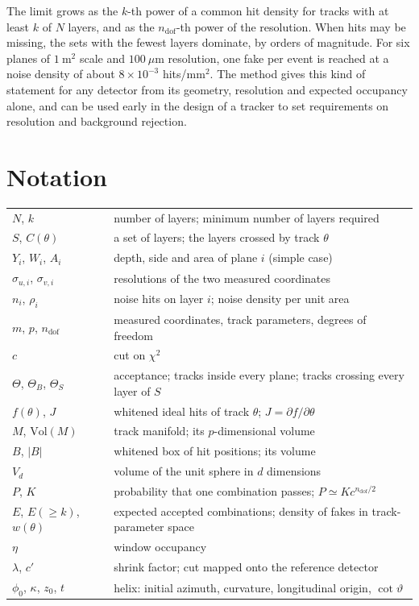 \IfFileExists{jinst.cls}{\documentclass[a4paper,11pt]{jinst}}
\newcommand{\ndof}{n_\mathrm{dof}}
\newcommand{\Vol}{\mathrm{Vol}}
\begin{document}
The limit grows as the $k$-th power of a common hit density for tracks with at least $k$ of $N$
layers, and as the $\ndof$-th power of the resolution. When hits may be missing, the sets with the
fewest layers dominate, by orders of magnitude. For six planes of $1~\mathrm{m}^2$ scale and
$100~\mu$m resolution, one fake per event is reached at a noise density of about
$8\times10^{-3}$ hits/mm$^2$. The method gives this kind of statement for any detector from its
geometry, resolution and expected occupancy alone, and can be used early in the design of a
tracker to set requirements on resolution and background rejection.

\appendix
\section{Notation}\label{app:notation}

\begin{tabular}{ll}
  $N$, $k$ & number of layers; minimum number of layers required \\
  $S$, $C(\theta)$ & a set of layers; the layers crossed by track $\theta$ \\
  $Y_i$, $W_i$, $A_i$ & depth, side and area of plane $i$ (simple case) \\
  $\sigma_{u,i}$, $\sigma_{v,i}$ & resolutions of the two measured coordinates \\
  $n_i$, $\rho_i$ & noise hits on layer $i$; noise density per unit area \\
  $m$, $p$, $\ndof$ & measured coordinates, track parameters, degrees of freedom \\
  $c$ & cut on $\chi^2$ \\
  $\Theta$, $\Theta_B$, $\Theta_S$ & acceptance; tracks inside every plane; tracks crossing every layer of $S$ \\
  $f(\theta)$, $J$ & whitened ideal hits of track $\theta$; $J=\partial f/\partial\theta$ \\
  $M$, $\Vol(M)$ & track manifold; its $p$-dimensional volume \\
  $B$, $|B|$ & whitened box of hit positions; its volume \\
  $V_d$ & volume of the unit sphere in $d$ dimensions \\
  $P$, $K$ & probability that one combination passes; $P\simeq Kc^{\ndof/2}$ \\
  $E$, $E(\ge k)$, $w(\theta)$ & expected accepted combinations; density of fakes in track-parameter space \\
  $\eta$ & window occupancy \\
  $\lambda$, $c'$ & shrink factor; cut mapped onto the reference detector \\
  $\phi_0$, $\kappa$, $z_0$, $t$ & helix: initial azimuth, curvature, longitudinal origin, $\cot\vartheta$ \\
\end{tabular}
\end{document}
